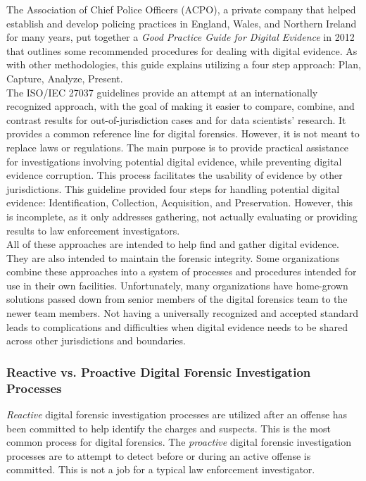 \documentclass[12pt]{article}
\begin{document}
The Association of Chief Police Officers (ACPO), a private company that helped establish and
develop policing practices in England, Wales, and Northern Ireland for many years,
put together a {\em Good Practice Guide for Digital Evidence}\cite{williams2012acpo} in 2012 that outlines some
recommended procedures for dealing with digital evidence.  As with other methodologies, this guide
explains utilizing a four step approach: Plan, Capture, Analyze, Present.\\

The ISO/IEC 27037 guidelines provide an attempt at an internationally 
recognized approach,
with the goal of making it easier to compare, combine, and contrast
results for out-of-jurisdiction cases and for data scientists' research.  It provides a
common reference line for 
digital forensics\cite{ajijola2014review}.  However, it is not meant to replace laws or regulations.
The main purpose is to provide practical
assistance for investigations involving potential digital evidence, while preventing digital
evidence corruption.  This
process facilitates the usability of evidence by other jurisdictions.  This guideline provided
four steps for handling
potential digital evidence: Identification, Collection, Acquisition, and Preservation.  However,
this is incomplete, as
it only addresses gathering, not actually evaluating or providing results to law enforcement
investigators.\\

All of these approaches are intended to help find and gather digital evidence.  They are also intended
to maintain the forensic integrity.  Some organizations combine these approaches into a system of
processes and procedures intended for use in their own facilities.  Unfortunately, many organizations have
home-grown solutions passed down from senior members of the digital forensics team to the newer
team members.  Not having a universally recognized and accepted standard 
leads to complications and difficulties when digital evidence needs to be shared across other
jurisdictions and boundaries\cite{ajijola2014review}.\\

\subsubsection{Reactive vs. Proactive Digital Forensic Investigation Processes}

\textit{Reactive} digital forensic investigation processes are utilized after an offense has been committed to help
identify the charges and suspects.  This is the most common process for digital forensics.  The \textit{proactive}
digital forensic investigation processes are to attempt to detect before or during an active offense is committed.
This is not a job for a typical law enforcement investigator.\\
\end{document}
